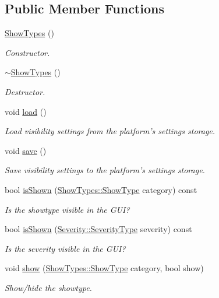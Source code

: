 \subsection*{Public Member Functions}
\begin{DoxyCompactItemize}
\item 
\hyperlink{class_show_types_a5293ad54d51a491953f7a62584716e20}{Show\-Types} ()
\begin{DoxyCompactList}\small\item\em Constructor. \end{DoxyCompactList}\item 
\hyperlink{class_show_types_ad3cc3530f5d6e85768d52b5c3902c707}{$\sim$\-Show\-Types} ()
\begin{DoxyCompactList}\small\item\em Destructor. \end{DoxyCompactList}\item 
void \hyperlink{class_show_types_ab73a2b29080ec35a9dfdc783f8bc77af}{load} ()
\begin{DoxyCompactList}\small\item\em Load visibility settings from the platform's settings storage. \end{DoxyCompactList}\item 
void \hyperlink{class_show_types_a9368edd3025bca834ff46aa15e366ae7}{save} ()
\begin{DoxyCompactList}\small\item\em Save visibility settings to the platform's settings storage. \end{DoxyCompactList}\item 
bool \hyperlink{class_show_types_aa627d1764dd2153ddb5f652b23cc24e0}{is\-Shown} (\hyperlink{class_show_types_a92c368f2a33741268265ac2d931eae3f}{Show\-Types\-::\-Show\-Type} category) const 
\begin{DoxyCompactList}\small\item\em Is the showtype visible in the G\-U\-I? \end{DoxyCompactList}\item 
bool \hyperlink{class_show_types_a7c91199008b7d2e339ec9ef91b99da48}{is\-Shown} (\hyperlink{class_severity_ac185938ae084355bbf1790cf1a70caa6}{Severity\-::\-Severity\-Type} severity) const 
\begin{DoxyCompactList}\small\item\em Is the severity visible in the G\-U\-I? \end{DoxyCompactList}\item 
void \hyperlink{class_show_types_a64893d9e73af5f859648d2f424667b20}{show} (\hyperlink{class_show_types_a92c368f2a33741268265ac2d931eae3f}{Show\-Types\-::\-Show\-Type} category, bool show)
\begin{DoxyCompactList}\small\item\em Show/hide the showtype. \end{DoxyCompactList}\end{DoxyCompactItemize}
